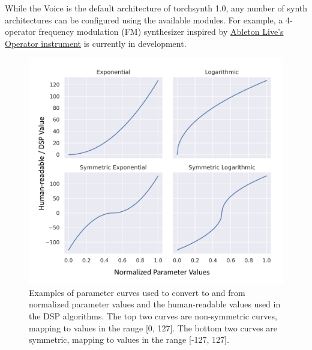 While the Voice is the default architecture of torchsynth 1.0, any number of synth architectures can be configured using the available modules. For example, a 4-operator frequency modulation (FM) \cite{chowning1973synthesis} synthesizer inspired by \href{https://www.ableton.com/en/packs/operator/}{Ableton Live's Operator instrument} is currently in development.

\begin{figure}[thb]
    \centering
    \includegraphics[width=0.95\linewidth]{Hyperparam_4.pdf}
    \caption{Examples of parameter curves used to convert to and from normalized parameter values and the human-readable values used in the DSP algorithms. The top two curves are non-symmetric curves, mapping to values in the range [0, 127]. The bottom two curves are symmetric, mapping to values in the range [-127, 127].}
    \label{fig:parameter_curves}
\end{figure}

